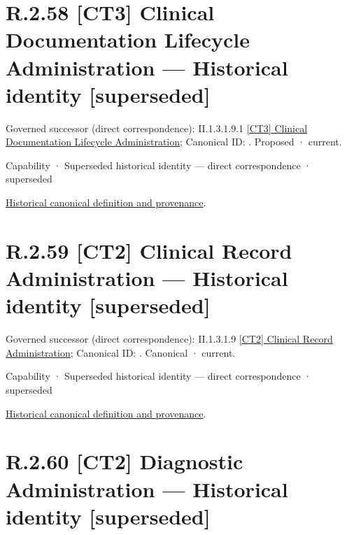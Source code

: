 \section*{R.2.58 [CT3] Clinical Documentation Lifecycle Administration — Historical identity [superseded]}
\label{navigation:R.2.58}

{\small Governed successor (direct correspondence): II.1.3.1.9.1 \hyperref[element:df683100067b47e785037c27cfd17a3c]{[CT3] Clinical Documentation Lifecycle Administration}; Canonical ID: \texttt{}. Proposed · current.}\par
\label{element:5b1636373a8d4e788b3ddbc1659a47ef}
{\small Capability · Superseded historical identity — direct correspondence · superseded}\par
\href{../../../../continuum/strategy/capability/5b1636373a8d4e788b3ddbc1659a47ef.md}{Historical canonical definition and provenance}.\par
\section*{R.2.59 [CT2] Clinical Record Administration — Historical identity [superseded]}
\label{navigation:R.2.59}

{\small Governed successor (direct correspondence): II.1.3.1.9 \hyperref[element:ce9e7e7b22054cefb707a650d5be7219]{[CT2] Clinical Record Administration}; Canonical ID: \texttt{}. Canonical · current.}\par
\label{element:be3f2e695eda403fbce8118daf83d386}
{\small Capability · Superseded historical identity — direct correspondence · superseded}\par
\href{../../../../continuum/strategy/capability/be3f2e695eda403fbce8118daf83d386.md}{Historical canonical definition and provenance}.\par
\section*{R.2.60 [CT2] Diagnostic Administration — Historical identity [superseded]}
\label{navigation:R.2.60}

